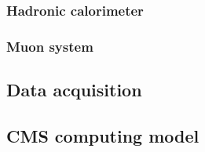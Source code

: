 \subsubsection{Hadronic calorimeter}
\subsubsection{Muon system}

\subsection{Data acquisition}
\subsection{CMS computing model}
